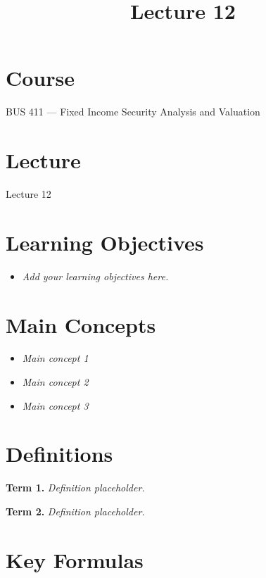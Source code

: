 \documentclass[
  letterpaper,
  DIV=11,
  numbers=noendperiod]{scrartcl}
\title{Lecture 12}
\author{}
\date{}
\providecommand{\tightlist}{%
  \setlength{\itemsep}{0pt}\setlength{\parskip}{0pt}}
\renewcommand*\contentsname{Table of contents}
\newcommand\contentsname{Table of contents}
\begin{document}
\maketitle

\renewcommand*\contentsname{Table of contents}
{
\hypersetup{linkcolor=}
\setcounter{tocdepth}{3}
\tableofcontents
}

\section{Course}\label{course}

BUS 411 --- Fixed Income Security Analysis and Valuation

\section{Lecture}\label{lecture}

Lecture 12

\section{Learning Objectives}\label{learning-objectives}

\begin{itemize}
\tightlist
\item
  \emph{Add your learning objectives here.}
\end{itemize}

\section{Main Concepts}\label{main-concepts}

\begin{itemize}
\tightlist
\item
  \emph{Main concept 1}
\item
  \emph{Main concept 2}
\item
  \emph{Main concept 3}
\end{itemize}

\section{Definitions}\label{definitions}

\textbf{Term 1.} \emph{Definition placeholder.}

\textbf{Term 2.} \emph{Definition placeholder.}

\section{Key Formulas}\label{key-formulas}
\end{document}
